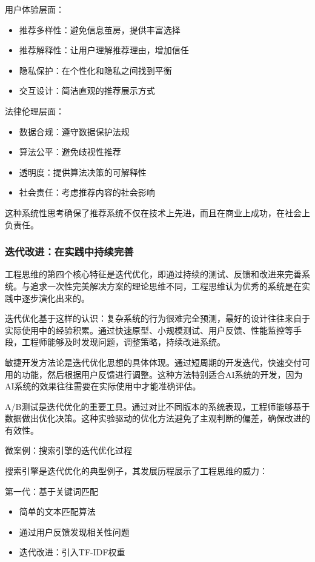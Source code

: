 用户体验层面：
\begin{itemize}
\item 推荐多样性：避免信息茧房，提供丰富选择
\item 推荐解释性：让用户理解推荐理由，增加信任
\item 隐私保护：在个性化和隐私之间找到平衡
\item 交互设计：简洁直观的推荐展示方式
\end{itemize}

法律伦理层面：
\begin{itemize}
\item 数据合规：遵守数据保护法规
\item 算法公平：避免歧视性推荐
\item 透明度：提供算法决策的可解释性
\item 社会责任：考虑推荐内容的社会影响
\end{itemize}

这种系统性思考确保了推荐系统不仅在技术上先进，而且在商业上成功，在社会上负责任。

\subsubsection{迭代改进：在实践中持续完善}

工程思维的第四个核心特征是迭代优化，即通过持续的测试、反馈和改进来完善系统。与追求一次性完美解决方案的理论思维不同，工程思维认为优秀的系统是在实践中逐步演化出来的。

迭代优化基于这样的认识：复杂系统的行为很难完全预测，最好的设计往往来自于实际使用中的经验积累。通过快速原型、小规模测试、用户反馈、性能监控等手段，工程师能够及时发现问题，调整策略，持续改进系统。

敏捷开发方法论是迭代优化思想的具体体现。通过短周期的开发迭代，快速交付可用的功能，然后根据用户反馈进行调整。这种方法特别适合AI系统的开发，因为AI系统的效果往往需要在实际使用中才能准确评估。

A/B测试是迭代优化的重要工具。通过对比不同版本的系统表现，工程师能够基于数据做出优化决策。这种实验驱动的优化方法避免了主观判断的偏差，确保改进的有效性。

微案例：搜索引擎的迭代优化过程

搜索引擎是迭代优化的典型例子，其发展历程展示了工程思维的威力：

第一代：基于关键词匹配
\begin{itemize}
\item 简单的文本匹配算法
\item 通过用户反馈发现相关性问题
\item 迭代改进：引入TF-IDF权重
\end{itemize}

